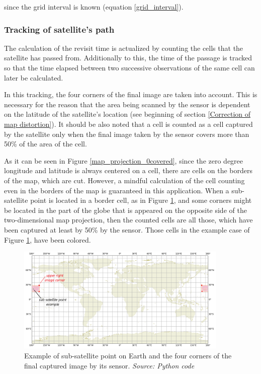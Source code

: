 since the grid interval is known (equation \ref{grid_interval}).


\bigskip
\subsubsection{Tracking of satellite's path}
\bigskip

The calculation of the revisit time is actualized by counting the cells that the satellite has passed from. Additionally to this, the time of the passage is tracked so that the time elapsed between two successive observations of the same cell can later be calculated. 

In this tracking, the four corners of the final image are taken into account. This is necessary for the reason that the area being scanned by the sensor is dependent on the latitude of the satellite's location (see beginning of section \ref{Correction of map distortion}). It should be also noted that a cell is counted as a cell captured by the satellite only when the final image taken by the sensor covers more than 50\% of the area of the cell.

As it can be seen in Figure \ref{map_projection_0covered}, since the zero degree longitude and latitude is always centered on a cell, there are cells on the borders of the map, which are cut. However, a mindful calculation of the cell counting even in the borders of the map is guaranteed in this application. When a sub-satellite point is located in a border cell, as in Figure \ref{correct_calculation}, and some corners might be located in the part of the globe that is appeared on the opposite side of the two-dimensional map projection, then the counted cells are all those, which have been captured at least by 50\% by the sensor. Those cells in the example case of Figure \ref{correct_calculation}, have been colored.

\begin{figure}
\centering
\includegraphics[width=0.9\textwidth]{Images/correct_calculation.png}\caption{Example of sub-satellite point on Earth and the four corners of the final captured image by its sensor. \textit{Source: Python code}}
\label{correct_calculation}
\end{figure}

